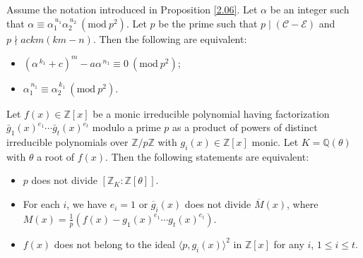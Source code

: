 \documentclass[10pt,a4paper]{amsart}
\newcommand{\Mod}[1]{\ (\mathrm{mod}\ #1)} %
\newcommand{\Q}{\mathbb{Q}}
\newcommand{\Z}{\mathbb{Z}}
\newcommand{\calC}{\mathcal{C}}
\newcommand{\calE}{\mathcal{E}}
\renewcommand{\a}{\alpha}
\begin{document}
\begin{proposition} \label{4.4:prop}
    Assume the notation introduced in Proposition \ref{2.06}. Let $\a$ be an integer such that $\a \equiv \a_1^{\,u_1}\a_2^{\,u_2} \Mod{p^2}$. Let $p$ be the prime such that $p \mid (\calC - \calE)$ and $p \nmid ackm(km-n)$. Then the following are equivalent:
    \begin{itemize}
        \item[\textup{(i)}] $(\alpha^{\,k_1} + c)^m - a \alpha^{\,n_1} \equiv 0 \Mod{p^2}$;
        \item[\textup{(ii)}] $\alpha_1^{\,n_1} \equiv \alpha_2^{\,k_1} \Mod{p^2}$.
    \end{itemize}
\end{proposition}

\begin{lemma}\label{dedekind}
	Let  $f(x) \in \Z[x]$ be a monic irreducible polynomial  having factorization $\bar{g}_1(x)^{e_1} \cdots \bar{g}_{t}(x)^{e_{t}}$ modulo a prime $p$ as a product of powers of distinct irreducible polynomials over $\Z/p\Z$ with $g_i(x) \in \Z[x]$ monic. Let $K=\Q(\theta)$ with $\theta$ a root of $f(x)$.   Then the following statements are equivalent:
	\begin{itemize}
		\item[\textup{(i)}] $p$ does not divide $[\Z_K:\Z[\theta]]$.
		\item[\textup{(ii)}] For each $i$, we have $e_i =1 $ or $\overline g_i (x)$ does not divide $\overline M(x)$, where $M(x) = \frac{1}{p}(f(x) -  g_1 (x)^{e_1} \cdots  g_{t} (x)^{e_{t}} )$.
		\item[\textup{(iii)}] $f(x)$ does not belong to the ideal $\langle p, g_i(x)\rangle^2$ in $\Z[x]$ for any $i$, $1\leq i\leq t$.
	\end{itemize}
\end{lemma} 
\end{document}
